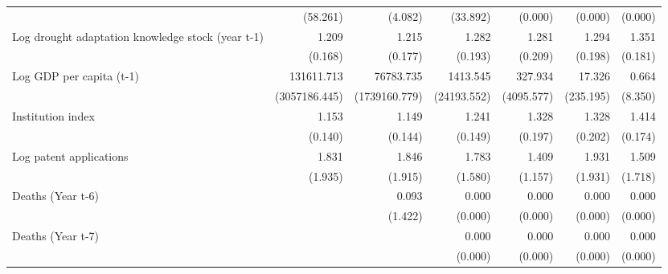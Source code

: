\begin{table}[htbp]
\begin{tabular}{l*{6}{D{.}{.}{-1}}}
                    &    (58.261)         &     (4.082)         &    (33.892)         &     (0.000)         &     (0.000)         &     (0.000)         \\
\addlinespace
Log drought adaptation knowledge stock (year t-1)&       1.209         &       1.215         &       1.282\sym{*}  &       1.281\sym{\%}  &       1.294\sym{*}  &       1.351\sym{**} \\
                    &     (0.168)         &     (0.177)         &     (0.193)         &     (0.209)         &     (0.198)         &     (0.181)         \\
\addlinespace
Log GDP per capita (t-1)&  131611.713         &   76783.735         &    1413.545         &     327.934         &      17.326         &       0.664         \\
                    &(3057186.445)         &(1739160.779)         & (24193.552)         &  (4095.577)         &   (235.195)         &     (8.350)         \\
\addlinespace
Institution index   &       1.153         &       1.149         &       1.241\sym{*}  &       1.328\sym{*}  &       1.328\sym{*}  &       1.414\sym{***}\\
                    &     (0.140)         &     (0.144)         &     (0.149)         &     (0.197)         &     (0.202)         &     (0.174)         \\
\addlinespace
Log patent applications&       1.831         &       1.846         &       1.783         &       1.409         &       1.931         &       1.509         \\
                    &     (1.935)         &     (1.915)         &     (1.580)         &     (1.157)         &     (1.931)         &     (1.718)         \\
\addlinespace
Deaths (Year t-6)   &                     &       0.093         &       0.000         &       0.000         &       0.000         &       0.000         \\
                    &                     &     (1.422)         &     (0.000)         &     (0.000)         &     (0.000)         &     (0.000)         \\
\addlinespace
Deaths (Year t-7)   &                     &                     &       0.000         &       0.000         &       0.000         &       0.000         \\
                    &                     &                     &     (0.000)         &     (0.000)         &     (0.000)         &     (0.000)         \\

\end{tabular}
\end{table}
